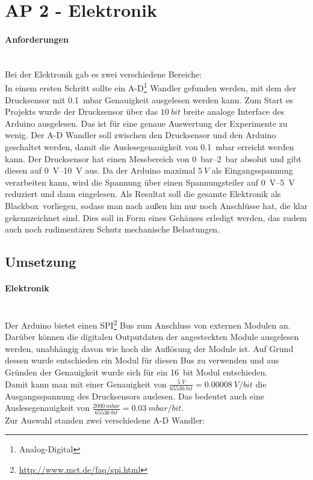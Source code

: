\newpage

\section{AP 2 - Elektronik}

\paragraph{Anforderungen}
\hfill \\
Bei der Elektronik gab es zwei verschiedene Bereiche: \\
In einem ersten Schritt sollte ein A-D\footnote{Analog-Digital} Wandler gefunden werden, mit dem der Drucksensor mit \SI{0,1}{mbar} Genauigkeit ausgelesen werden kann. Zum Start es Projekts wurde der Drucksensor über das $\SI{10}{bit}$ breite analoge Interface des Arduino ausgelesen. Das ist für eine genaue Auswertung der Experimente zu wenig. Der A-D Wandler soll zwischen den Drucksensor und den Arduino geschaltet werden, damit die Auslesegenauigkeit von \SI{0,1}{mbar} erreicht werden kann. Der Drucksensor hat einen Messbereich von \SIrange{0}{2}{\bar} absolut und gibt diesen auf \SIrange{0}{10}{\volt} aus. Da der Arduino maximal $\SI{5}{V}$ als Eingangsspannung verarbeiten kann, wird die Spannung über einen Spannungsteiler auf \SIrange{0}{5}{\volt} reduziert und dann eingelesen. 
Als Resultat soll die gesamte Elektronik als \glqq Blackbox\grqq \ vorliegen, sodass man nach außen hin nur noch Anschlüsse hat, die klar gekennzeichnet sind. Dies soll in Form eines Gehäuses erledigt werden, das zudem auch noch rudimentären Schutz mechanische Belastungen.


\subsection{Umsetzung}


\paragraph{Elektronik}
\hfill \\
Der Arduino bietet einen SPI\footnote{\url{http://www.mct.de/faq/spi.html}} Bus zum Anschluss von externen Modulen an. Darüber können die digitalen Outputdaten der angesteckten Module ausgelesen werden, unabhängig davon wie hoch die Auflösung der Module ist. Auf Grund dessen wurde entschieden ein Modul für diesen Bus zu verwenden und aus Gründen der Genauigkeit wurde sich für ein \SI{16}{bit} Modul entschieden. \\
Damit kann man mit einer Genauigkeit von $\frac{\SI{5}{V}}{\SI{65536}{bit}} = \SI{0,00008}{V/bit}$ die Ausgangsspannung des Drucksensors auslesen. Das bedeutet auch eine Auslesegenauigkeit von $\frac{\SI{2000}{mbar}}{\SI{65536}{bit}} = \SI{0,03}{mbar/bit}$. \\
Zur Auswahl standen zwei verschiedene A-D Wandler:

